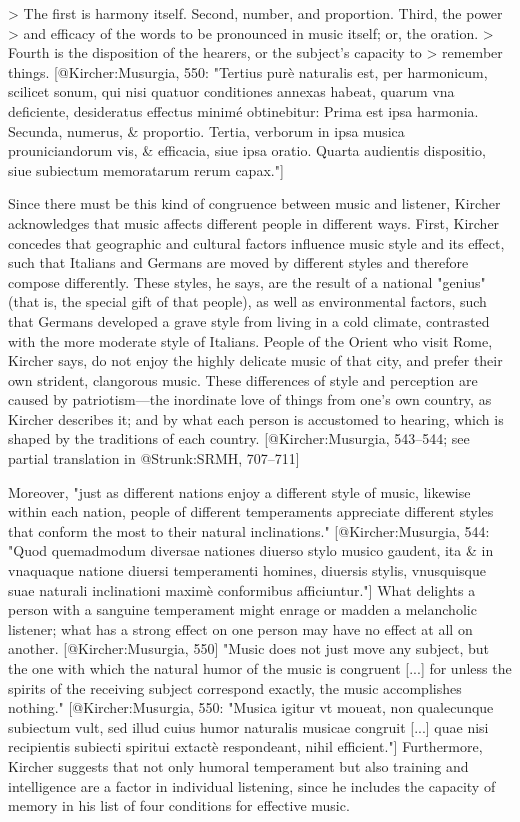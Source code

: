 > The first is harmony itself. Second, number, and proportion. Third, the power
> and efficacy of the words to be pronounced in music itself; or, the oration.
> Fourth is the disposition of the hearers, or the subject's capacity to
> remember things. 
[@Kircher:Musurgia, 550: 
"Tertius purè naturalis est, per harmonicum, scilicet sonum, qui nisi quatuor
conditiones annexas habeat, quarum vna deficiente, desideratus effectus minimé
obtinebitur: Prima est ipsa harmonia. Secunda, numerus, & proportio. Tertia,
verborum in ipsa musica prouniciandorum vis, & efficacia, siue ipsa oratio.
Quarta audientis dispositio, siue subiectum memoratarum rerum capax."]

Since there must be this kind of congruence between music and listener, Kircher
acknowledges that music affects different people in different ways. 
First, Kircher concedes that geographic and cultural factors influence music
style and its effect, such that Italians and Germans are moved by different
styles and therefore compose differently. 
These styles, he says, are the result of a national "genius" (that is, the
special gift of that people), as well as environmental factors, such that
Germans developed a grave style from living in a cold climate, contrasted with
the more moderate style of Italians. 
People of the Orient who visit Rome, Kircher says, do not enjoy the highly
delicate music of that city, and prefer their own strident, clangorous music.
These differences of style and perception are caused by patriotism---the
inordinate love of things from one's own country, as Kircher describes it; and
by what each person is accustomed to hearing, which is shaped by the traditions
of each country. 
[@Kircher:Musurgia, 543--544; see partial translation in @Strunk:SRMH, 707--711]

Moreover, "just as different nations enjoy a different style of music, likewise
within each nation, people of different temperaments appreciate different styles
that conform the most to their natural inclinations." 
[@Kircher:Musurgia, 544:
"Quod quemadmodum diversae nationes diuerso stylo musico gaudent, ita & in
vnaquaque natione diuersi temperamenti homines, diuersis stylis, vnusquisque suae
naturali inclinationi maximè conformibus afficiuntur."]
What delights a person with a sanguine temperament might enrage or madden a
melancholic listener; what has a strong effect on one person may have no effect
at all on another. 
[@Kircher:Musurgia, 550]
"Music does not just move any subject, but the one with which the natural humor
of the music is congruent [...] for unless the spirits of the receiving subject
correspond exactly, the music accomplishes nothing." 
[@Kircher:Musurgia, 550:
"Musica igitur vt moueat, non qualecunque subiectum vult, sed illud cuius humor
naturalis musicae congruit [...] quae nisi recipientis subiecti spiritui extactè
respondeant, nihil efficient."]
Furthermore, Kircher suggests that not only humoral temperament but also training
and intelligence are a factor in individual listening, since he includes the
capacity of memory in his list of four conditions for effective music. 


